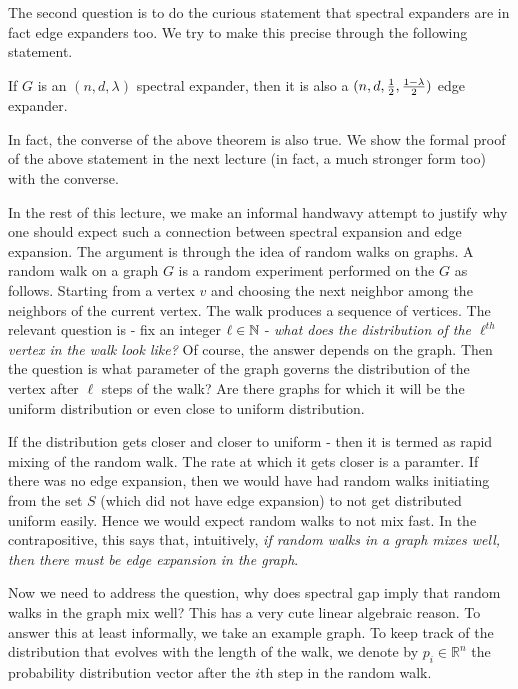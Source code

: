 The second question is to do the curious statement that spectral expanders are in fact edge expanders too. We try to make this precise through the following statement.

\begin{theorem}
If $G$ is an $(n,d,\lambda)$ spectral expander, then it is also a $(n,d,\frac{1}{2},\frac{1-\lambda}{2})$ edge expander.
\end{theorem}

In fact, the converse of the above theorem is also true. We show the formal proof of the above statement in the next lecture (in fact, a much stronger form too) with the converse.

In the rest of this lecture, we make an informal handwavy attempt to justify why one should expect such a connection between spectral expansion and edge expansion. The argument is through the idea of random walks on graphs. A random walk on a graph $G$ is a random experiment performed on the $G$ as follows. Starting from a vertex $v$ and choosing the next neighbor among the neighbors of the current vertex. The walk produces a sequence of vertices. The relevant question is - fix an integer $\ell \in \mathbb{N}$ - {\em what does the distribution of the $\ell^{th}$ vertex in the walk look like?} Of course, the answer depends on the graph. Then the question is what parameter of the graph governs the distribution of the vertex after $\ell$ steps of the walk? Are there graphs for which it will be the uniform distribution or even close to uniform distribution.

If the distribution gets closer and closer to uniform - then it is termed as {rapid mixing of the random walk}. The rate at which it gets closer is a paramter. If there was no edge expansion, then we would have had random walks initiating from the set $S$ (which did not have edge expansion) to not get distributed uniform easily. Hence we would expect random walks to not mix fast. In the contrapositive, this says that, intuitively, \textit{if random walks in a graph mixes well, then there must be edge expansion in the graph}.

Now we need to address the question, why does spectral gap imply that random walks in the graph mix well? This has a very cute linear algebraic reason. To answer this at least informally, we take an example graph. To keep track of the distribution that evolves with the length of the walk, we denote by $p_i \in \mathbb{R}^n$ the probability distribution vector after the $i$th step in the random walk.

